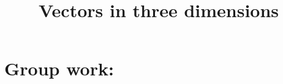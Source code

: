 \documentclass[]{ximera}
\title{Vectors in three dimensions}
\begin{document}
\begin{abstract}		\end{abstract}
\maketitle

\section{Group work:}
\end{document}

